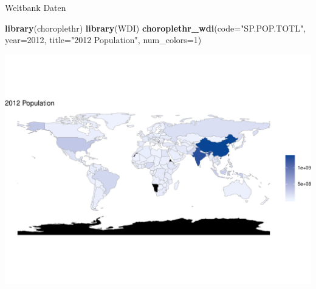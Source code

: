 \documentclass[ignorenonframetext,]{beamer}
\newenvironment{Shaded}{\begin{snugshade}}{\end{snugshade}}
\newcommand{\KeywordTok}[1]{\textcolor[rgb]{0.13,0.29,0.53}{\textbf{#1}}}
\newcommand{\DataTypeTok}[1]{\textcolor[rgb]{0.13,0.29,0.53}{#1}}
\newcommand{\DecValTok}[1]{\textcolor[rgb]{0.00,0.00,0.81}{#1}}
\newcommand{\StringTok}[1]{\textcolor[rgb]{0.31,0.60,0.02}{#1}}
\newcommand{\NormalTok}[1]{#1}
\begin{document}
\begin{frame}[fragile]{Weltbank Daten}

\begin{Shaded}
\begin{Highlighting}[]
\KeywordTok{library}\NormalTok{(choroplethr)}
\KeywordTok{library}\NormalTok{(WDI) }
\KeywordTok{choroplethr_wdi}\NormalTok{(}\DataTypeTok{code=}\StringTok{"SP.POP.TOTL"}\NormalTok{, }\DataTypeTok{year=}\DecValTok{2012}\NormalTok{, }
                \DataTypeTok{title=}\StringTok{"2012 Population"}\NormalTok{, }
                \DataTypeTok{num_colors=}\DecValTok{1}\NormalTok{)}
\end{Highlighting}
\end{Shaded}

\includegraphics{Choroplethen_files/figure-beamer/unnamed-chunk-26-1.pdf}

\end{frame}
\end{document}
